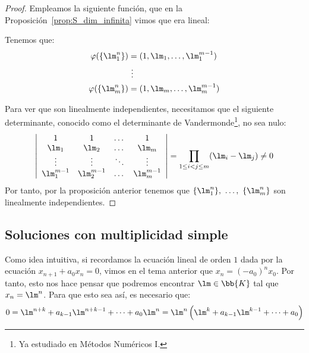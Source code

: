 \begin{proof}
    Empleamos la siguiente función, que en la Proposición~\ref{prop:S_dim_infinita} vimos que era lineal:

    Tenemos que:
    \begin{align*}
        \varphi(\{\lm_1^n\}) &= (1,\lm_1, \dots,\lm_1^{m-1})\\
        &~ \vdots\\
        \varphi(\{\lm_m^n\}) &= (1,\lm_m, \dots,\lm_m^{m-1})\\
    \end{align*}

    Para ver que son linealmente independientes, necesitamos que el siguiente determinante, conocido como el determinante de Vandermonde\footnote{Ya estudiado en Métodos Numéricos I.}, no sea nulo:
    \begin{equation*}
        \left|
        \begin{array}{cccc}
            1 & 1 & \dots & 1\\
            \lm_1 & \lm_2 & \dots & \lm_m\\
            \vdots& \vdots& \ddots & \vdots\\
            \lm_1^{m-1} & \lm_2^{m-1} & \dots & \lm_m^{m-1}
        \end{array}
        \right| = \prod_{1\leq i<j\leq m} (\lm_i-\lm_j) \neq 0
    \end{equation*}
    Por tanto, por la proposición anterior tenemos que $\{\lm_1^n\},~\dots,~\{\lm_m^n\}$ son linealmente independientes.
\end{proof}

\subsection{Soluciones con multiplicidad simple}
Como idea intuitiva, si recordamos la ecuación lineal de orden $1$ dada por la ecuación ${x_{n+1} + a_0x_n = 0}$, vimos en el tema anterior que $x_{n} = (-a_0)^nx_0$. Por tanto, esto nos hace pensar que podremos encontrar $\lm\in \bb{K}$ tal que $x_n=\lm ^n$. Para que esto sea así, es necesario que:
\begin{equation*}
    0 = \lm^{n+k} + a_{k-1}\lm^{n+k-1} + \dots + a_0\lm^n = \lm^n \left(\lm^k + a_{k-1}\lm^{k-1} + \dots + a_0\right)
\end{equation*}

